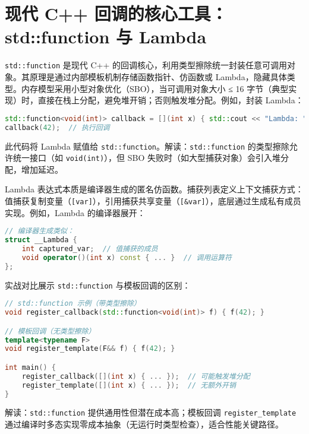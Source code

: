 \chapter{现代 C++ 回调的核心工具：std::function 与 Lambda}
\texttt{std::function} 是现代 C++ 的回调核心，利用类型擦除统一封装任意可调用对象。其原理是通过内部模板机制存储函数指针、仿函数或 Lambda，隐藏具体类型。内存模型采用小型对象优化（SBO），当可调用对象大小 ≤ 16 字节（典型实现）时，直接在栈上分配，避免堆开销；否则触发堆分配。例如，封装 Lambda：\par
\begin{lstlisting}[language=cpp]
std::function<void(int)> callback = [](int x) { std::cout << "Lambda: " << x << std::endl; };  
callback(42);  // 执行回调  
\end{lstlisting}
此代码将 Lambda 赋值给 \texttt{std::function}。解读：\texttt{std::function} 的类型擦除允许统一接口（如 \texttt{void(int)}），但 SBO 失败时（如大型捕获对象）会引入堆分配，增加延迟。\par
Lambda 表达式本质是编译器生成的匿名仿函数。捕获列表定义上下文捕获方式：值捕获复制变量（\texttt{[var]}），引用捕获共享变量（\texttt{[\&{}var]}），底层通过生成私有成员实现。例如，Lambda 的编译器展开：\par
\begin{lstlisting}[language=cpp]
// 编译器生成类似：  
struct __Lambda {  
    int captured_var;  // 值捕获的成员  
    void operator()(int x) const { ... }  // 调用运算符  
};  
\end{lstlisting}
实战对比展示 \texttt{std::function} 与模板回调的区别：\par
\begin{lstlisting}[language=cpp]
// std::function 示例（带类型擦除）  
void register_callback(std::function<void(int)> f) { f(42); }  

// 模板回调（无类型擦除）  
template<typename F>  
void register_template(F&& f) { f(42); }  

int main() {  
    register_callback([](int x) { ... });  // 可能触发堆分配  
    register_template([](int x) { ... });  // 无额外开销  
}  
\end{lstlisting}
解读：\texttt{std::function} 提供通用性但潜在成本高；模板回调 \texttt{register\_{}template} 通过编译时多态实现零成本抽象（无运行时类型检查），适合性能关键路径。\par

